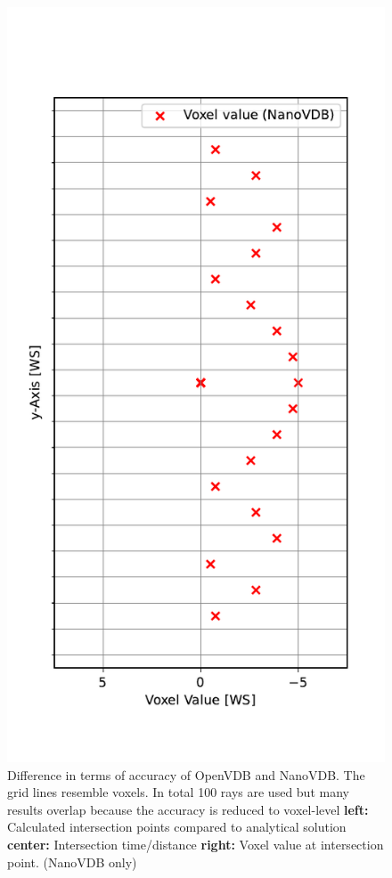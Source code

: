\begin{figure}[h]
	\includegraphics[width=\linewidth]{res/intersection_values.pdf}
	\endminipage
	\caption{Difference in terms of accuracy of OpenVDB and NanoVDB. The grid lines resemble voxels. In total 100 rays are used but many results overlap because the accuracy is reduced to voxel-level
		\textbf{left:} Calculated intersection points compared to analytical solution
		\textbf{center:} Intersection time/distance
		\textbf{right:} Voxel value at intersection point. (NanoVDB only)
	}
	\label{fig:results_accuracy}
\end{figure}



